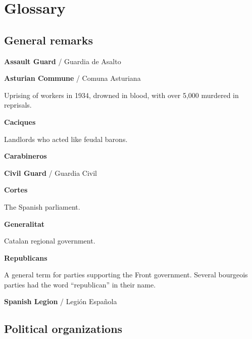 \chapter{Glossary}

\section{General remarks}

\begin{multicols}{2}
  \RaggedRight
  \setlength{\parskip}{0.25\baselineskip}

\textbf{Assault Guard} / Guardia de Asalto

\bigskip

\textbf{Asturian Commune} / Comuna Asturiana

Uprising of workers in 1934, drowned in blood, with over 5,000 murdered in reprisals.

\bigskip

\textbf{Caciques}

Landlords who acted like feudal barons.

\bigskip

\textbf{Carabineros}

\bigskip

\textbf{Civil Guard} / Guardia Civil

\bigskip

\textbf{Cortes}

The Spanish parliament.

\bigskip

\textbf{Generalitat}

Catalan regional government.

\bigskip

\textbf{Republicans}

A general term for parties supporting the Front government. Several bourgeois parties had the word “republican” in their name.

\bigskip

\textbf{Spanish Legion} / Legión Española

\end{multicols}

\section{Political organizations}

